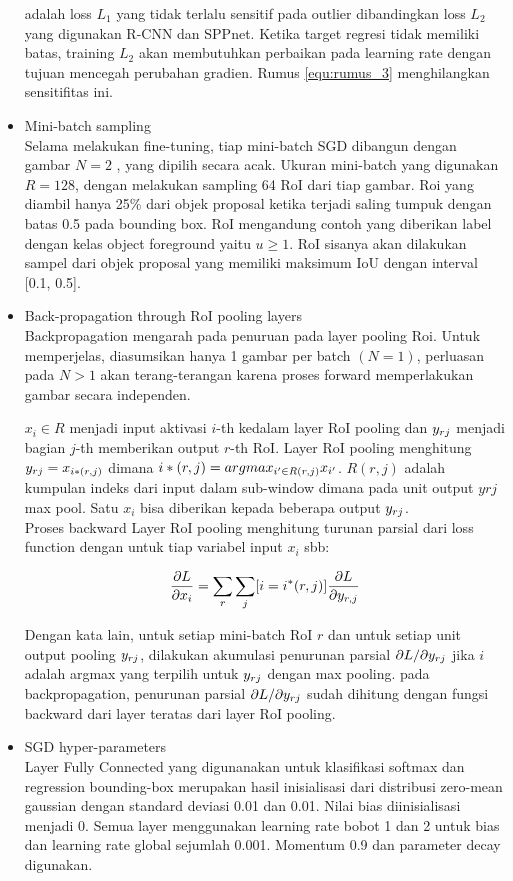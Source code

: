 \begin{itemize}
	adalah loss $L_1$ yang tidak terlalu sensitif pada outlier dibandingkan loss $L_2$ yang digunakan R-CNN dan SPPnet. Ketika target regresi tidak memiliki batas, training $L_2$ akan membutuhkan perbaikan pada learning rate dengan tujuan mencegah perubahan gradien. Rumus \ref{equ:rumus_3} menghilangkan sensitifitas ini.
	\item Mini-batch sampling\\
	Selama melakukan fine-tuning, tiap mini-batch SGD dibangun dengan gambar $N = 2$ , yang dipilih secara acak. Ukuran mini-batch yang digunakan $R = 128$, dengan melakukan sampling 64 RoI dari tiap gambar. Roi yang diambil hanya 25\% dari objek proposal ketika terjadi saling tumpuk dengan batas 0.5 pada bounding box. RoI mengandung contoh yang diberikan label dengan kelas object foreground yaitu $u \geq 1$. RoI sisanya akan dilakukan sampel dari objek proposal yang memiliki maksimum IoU dengan interval [0.1, 0.5].
	
	\item Back-propagation through RoI pooling layers\\
	Backpropagation mengarah pada penuruan pada layer pooling Roi. Untuk memperjelas, diasumsikan hanya 1 gambar per batch $(N = 1)$, perluasan pada $N > 1$ akan terang-terangan karena proses forward memperlakukan gambar secara independen.
	
	$x_i \in R$ menjadi input aktivasi $i$-th kedalam layer RoI pooling dan $y\sb{rj}$ menjadi bagian $j$-th memberikan output $r$-th RoI. Layer RoI pooling menghitung $y\sb{rj} = x\sb{i*(r,j)}$ dimana $i*(r,j) = argmax\sb{i' \in R(r,j)}x\sb{i'}$. $R(r, j)$ adalah kumpulan indeks dari input dalam sub-window dimana pada unit output $yrj$ max pool. Satu $x_i$ bisa diberikan kepada beberapa output $y\sb{rj}$. \\
	Proses backward Layer RoI pooling  menghitung turunan parsial dari loss function dengan untuk tiap variabel input $x_i$ sbb:
	
	\begin{equation}
	\label{equ:backward_roi_pooling}
	\frac{\partial L}{\partial x_i} = \sum_{r}^{}\sum_{j}^{}[i = i^* (r,j)] \frac{\partial L}{\partial y\sb{r,j}}
	\end{equation}
	
	Dengan kata lain, untuk setiap mini-batch RoI $r$ dan untuk setiap unit output pooling $y\sb{rj}$, dilakukan akumulasi penurunan parsial $\partial L/\partial y\sb{rj}$ jika $i$ adalah argmax yang terpilih untuk $y\sb{rj}$ dengan max pooling. pada backpropagation, penurunan parsial $\partial L/\partial y\sb{rj}$ sudah dihitung dengan fungsi backward dari layer teratas dari layer RoI pooling.
	
	\item SGD hyper-parameters\\
	Layer Fully Connected yang digunanakan untuk klasifikasi softmax dan regression bounding-box merupakan hasil inisialisasi dari distribusi zero-mean gaussian dengan standard deviasi 0.01 dan 0.01. Nilai bias diinisialisasi menjadi 0. Semua layer menggunakan learning rate bobot 1 dan 2 untuk bias dan learning rate global sejumlah 0.001. Momentum 0.9 dan parameter decay digunakan.
\end{itemize}


